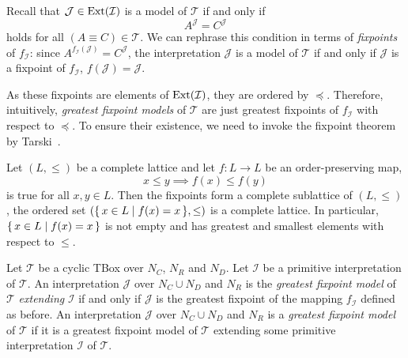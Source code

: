 Recall that $\mathcal{J} \in \operatorname{Ext}(\mathcal{I})$ is a model of $\mathcal{T}$ if and only if
\begin{equation*}
  A^{\mathcal{J}} = C^{\mathcal{J}}
\end{equation*}
holds for all $(A \equiv C) \in \mathcal{T}$.  We can rephrase this condition in terms of
\emph{fixpoints} of $f_{\mathcal{I}}$: since $A^{f_{\mathcal{I}}(\mathcal{J})} =
C^{\mathcal{J}}$, the interpretation $\mathcal{J}$ is a model of $\mathcal{T}$ if and only
if $\mathcal{J}$ is a fixpoint of $f_{\mathcal{I}}$, \ie $f(\mathcal{J}) = \mathcal{J}$.

As these fixpoints are elements of $\operatorname{Ext}(\mathcal{I})$, they are ordered by $\preceq$.
Therefore, intuitively, \emph{greatest fixpoint models} of $\mathcal{T}$ are just greatest
fixpoints of $f_{\mathcal{I}}$ with respect to $\preceq$.  To ensure their existence, we
need to invoke the fixpoint theorem by Tarski~\cite{Tarski-Fixpoint-Theorem}.

\begin{Theorem}
  \label{thm:tarski-fixpoint-theorem}
  Let $(L, \leq)$ be a complete lattice and let $f \colon L \to L$ be an order-preserving
  map, \ie
  \begin{equation*}
    x \leq y \implies f(x) \leq f(y)
  \end{equation*}
  is true for all $x, y \in L$.  Then the fixpoints form a complete sublattice of $(L,
  \leq)$, \ie the ordered set $({\{\, x \in L \mid f(x) = x \,\}}, \leq)$ is a complete
  lattice.  In particular, ${\{\, x \in L \mid f(x) = x \,\}}$ is not empty and has greatest
  and smallest elements with respect to $\leq$.
\end{Theorem}

\begin{Definition}
  \label{def:gfp-models}
  Let $\mathcal{T}$ be a cyclic TBox over $N_C$, $N_R$ and $N_D$.  Let $\mathcal{I}$ be a
  primitive interpretation of $\mathcal{T}$.  An interpretation $\mathcal{J}$ over $N_C
  \cup N_D$ and $N_R$ is the \emph{greatest fixpoint model} of $\mathcal{T}$
  \emph{extending} $\mathcal{I}$ if and only if $\mathcal{J}$ is the greatest fixpoint of
  the mapping $f_{\mathcal{I}}$ defined as before.  An interpretation $\mathcal{J}$ over
  $N_C \cup N_D$ and $N_R$ is a \emph{greatest fixpoint model} of $\mathcal{T}$ if it is a
  greatest fixpoint model of $\mathcal{T}$ extending some primitive interpretation
  $\mathcal{I}$ of $\mathcal{T}$.
\end{Definition}

